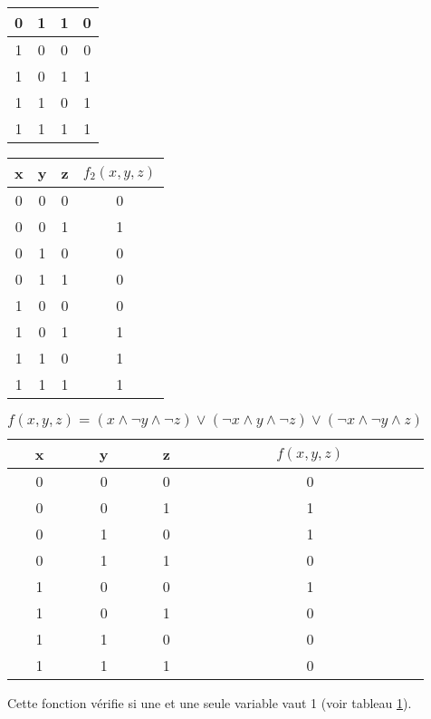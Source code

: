 \documentclass[a4paper,11pt]{article}
\begin{document}
\begin{Form}
\begin{exo}
\begin{multicols}{2}
\begin{center}
\begin{tabular}{|*4{c|}}
\hline 
0 & 1 & 1 & 0 \\
\hline 
1 & 0 & 0 & 0 \\ 
\hline 
1 & 0 & 1 & 1 \\ 
\hline 
1 & 1 & 0 & 1 \\
\hline 
1 & 1 & 1 & 1 \\
\hline 
\end{tabular}
\end{center}
\begin{center}
\begin{tabular}{|*4{c|}}
\hline 
x & y & z & $f_2(x,y,z)$ \\ 
\hline 
0 & 0 & 0 & 0 \\ 
\hline 
0 & 0 & 1 & 1 \\ 
\hline 
0 & 1 & 0 & 0 \\
\hline 
0 & 1 & 1 & 0 \\
\hline 
1 & 0 & 0 & 0 \\ 
\hline 
1 & 0 & 1 & 1 \\ 
\hline 
1 & 1 & 0 & 1 \\
\hline 
1 & 1 & 1 & 1 \\
\hline 
\end{tabular}
\end{center}
\end{multicols} 
\end{exo}
\begin{exo}
\begin{table}[!h]
\begin{center}
\begin{tabular}{|*4{c|}}
\hline 
x & y & z & $f(x,y,z)$ \\ 
\hline 
0 & 0 & 0 & 0 \\ 
\hline 
0 & 0 & 1 & 1 \\ 
\hline 
0 & 1 & 0 & 1 \\
\hline 
0 & 1 & 1 & 0 \\
\hline 
1 & 0 & 0 & 1 \\ 
\hline 
1 & 0 & 1 & 0 \\ 
\hline 
1 & 1 & 0 & 0 \\
\hline 
1 & 1 & 1 & 0 \\
\hline 
\end{tabular}
\caption{\label{ex5}$f(x,y,z)=(x\land \lnot y \land \lnot z)\lor (\lnot x \land y \land \lnot z) \lor (\lnot x \land \lnot y \land z)$}
\end{center}
\end{table} 
Cette fonction vérifie si une et une seule variable vaut 1 (voir tableau \ref{ex5}).\\

\end{exo}
\end{Form}
\end{document}
